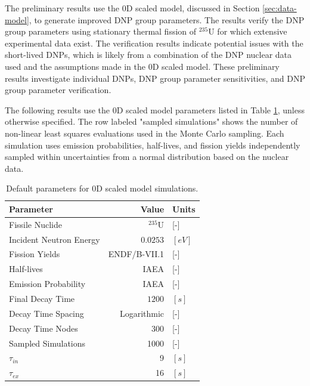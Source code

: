 The preliminary results use the 0D scaled model, discussed in Section \ref{sec:data-model}, to generate improved \gls{DNP} group parameters.
The results verify the \gls{DNP} group parameters using stationary thermal fission of $^{235}$U for which extensive experimental data exist.
The verification results indicate potential issues with the short-lived \glspl{DNP}, which is likely from a combination of the \gls{DNP} nuclear data used and the assumptions made in the 0D scaled model.
These preliminary results investigate individual \glspl{DNP}, \gls{DNP} group parameter sensitivities, and \gls{DNP} group parameter verification.

The following results use the 0D scaled model parameters listed in Table \ref{tab:default-0dsacled}, unless otherwise specified.
The row labeled "sampled simulations" shows the number of non-linear least squares evaluations used in the Monte Carlo sampling.
Each simulation uses emission probabilities, half-lives, and fission yields independently sampled within uncertainties from a normal distribution based on the nuclear data.

\begin{table}[]
    \centering
    \caption{Default parameters for 0D scaled model simulations.}
    \begin{tabular}{lrl}
        \hline
        Parameter & Value & Units\\
        \hline
        \rule{0pt}{2ex}\vspace{0.1 mm}Fissile Nuclide & \vspace{0.1 mm}$^{235}$U & [-]\\
        Incident Neutron Energy & $0.0253$ &$ [eV]$\\
        Fission Yields & ENDF/B-VII.1 \cite{chadwick2011endf} & [-]\\
        Half-lives & IAEA \cite{DIMITRIOU2021144} & [-]\\
        Emission Probability & IAEA \cite{DIMITRIOU2021144} & [-]\\
        Final Decay Time & $1200$ & $[s]$\\
        Decay Time Spacing & Logarithmic & [-]\\
        Decay Time Nodes & 300 & [-]\\
        Sampled Simulations & 1000 & [-]\\
        $\tau_{in}$ & 9 \cite{hanauer1967neutron} & $[s]$\\
        $\tau_{ex}$ & 16 \cite{hanauer1967neutron} & $[s]$\\
        \hline
    \end{tabular}
    \label{tab:default-0dsacled}
\end{table}

\FloatBarrier
